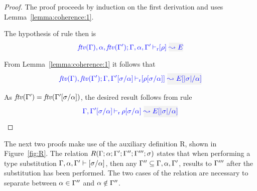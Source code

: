 {\centering
{}}

\begin{proof}
  The proof proceeds by induction on the first derivation and uses Lemma~\ref{lemma:coherence:1}.
  
  The hypothesis of rule  then is
\begin{equation*}
  \drres{\ftv{\tenv},\alpha,\ftv{\tenv'}}{\tenv,\alpha,\tenv'}{\rulet}{E}
\end{equation*}

  From Lemma~\ref{lemma:coherence:1} it follows that
\begin{equation*}
  \drres{\ftv{\tenv},\ftv{\tenv'}}{\tenv,\tenv'[\suty/\alpha]}{\rulet[\suty/\alpha]}{E[|\suty|/\alpha]}
\end{equation*}

  As ${\it ftv }(\Gamma') = {\it ftv }(\Gamma'[\sigma/\alpha])$, the desired result follows from rule
\begin{equation*}
 \dres{\tenv,\tenv'[\suty/\alpha]}{\rulet[\suty/\alpha]}{E[|\suty|/\alpha]}
\end{equation*}
\end{proof}

The next two proofs make use of the auxiliary definition R, shown in
Figure~\ref{fig:R}. The relation $R(\Gamma;\alpha;\Gamma';\Gamma'';\Gamma''';\sigma)$ states that
when performing a type substitution $\Gamma,\alpha,\Gamma' \vdash [\sigma/\alpha]$, then
any $\Gamma'' \subseteq \Gamma,\alpha,\Gamma'$, results to $\Gamma'''$ after the substitution has
been performed. The two cases of the relation are necessary to separate between
$\alpha\in\Gamma''$ and $\alpha\notin\Gamma''$.

